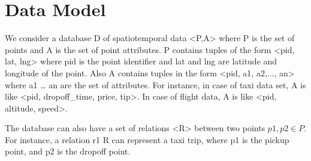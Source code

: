 \section{Data Model}\label{sec:datamodel}

We consider a database D of spatiotemporal data <P,A> where P is the set of points and A is the set of point attributes. P contains tuples of the form <pid, lat, lng> where pid is the point identifier and lat and lng are latitude and longitude of the point. Also A contains tuples in the form <pid, a1, a2,..., an> where a1 … an are the set of attributes. For instance, in case of taxi data set, A is like <pid, dropoff_time, price, tip>. In case of flight data, A is like <pid, altitude, speed>.

The database can also have a set of relations <R> between two points $p1,p2 \in P$. For instance,  a relation r1  R can represent a taxi trip, where p1 is the pickup point, and p2 is the dropoff point. 
